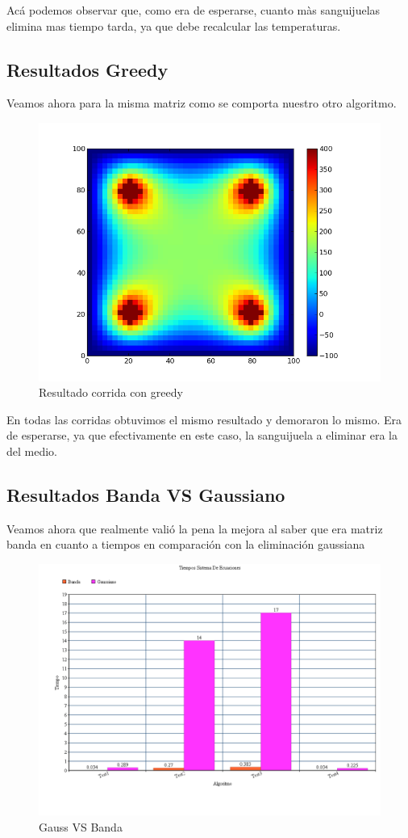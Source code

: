 Acá podemos observar que, como era de esperarse, cuanto màs sanguijuelas elimina mas tiempo tarda, ya que debe recalcular las temperaturas.

\subsection{Resultados Greedy}

Veamos ahora para la misma matriz como se comporta nuestro otro algoritmo. 


\begin{figure}[htb]
\begin{center}
\includegraphics[scale=0.50]{imagenes/random_2.png} 
\caption{Resultado corrida con greedy} 
\end{center}
\end{figure}
\newpage

En todas las corridas obtuvimos el mismo resultado y demoraron lo mismo. Era de esperarse, ya que efectivamente en este caso, la sanguijuela a eliminar era la del medio.

\subsection{Resultados Banda VS Gaussiano}
Veamos ahora que realmente valió la pena la mejora al saber que era matriz banda en cuanto a tiempos en comparación con la eliminación gaussiana

\begin{figure}[htb]
\begin{center}
\includegraphics[scale=0.50]{imagenes/tiemposGaussVsBanda.png} 
\caption{Gauss VS Banda} 
\end{center}
\end{figure}
